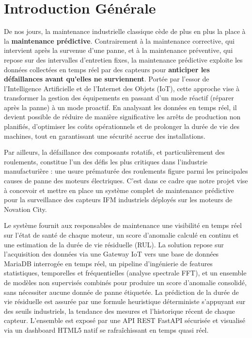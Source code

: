 \documentclass[12pt,a4paper]{report}
\begin{document}
\chapter*{Introduction Générale}

De nos jours, la maintenance industrielle classique cède de plus en plus la place à la
\textbf{maintenance prédictive}. Contrairement à la maintenance corrective, qui intervient
après la survenue d'une panne, et à la maintenance préventive, qui repose sur des
intervalles d'entretien fixes, la maintenance prédictive exploite les données collectées en
temps réel par des capteurs pour \textbf{anticiper les défaillances avant qu'elles ne
surviennent}. Portée par l'essor de l'Intelligence Artificielle et de l'Internet des Objets
(IoT), cette approche vise à transformer la gestion des équipements en passant d'un mode
réactif (réparer après la panne) à un mode proactif. En analysant les données en temps réel,
il devient possible de réduire de manière significative les arrêts de production non
planifiés, d'optimiser les coûts opérationnels et de prolonger la durée de vie des machines,
tout en garantissant une sécurité accrue des installations.

Par ailleurs, la défaillance des composants rotatifs, et particulièrement des roulements,
constitue l'un des défis les plus critiques dans l'industrie manufacturière : une usure
prématurée des roulements figure parmi les principales causes de panne des moteurs
électriques. C'est dans ce cadre que notre projet vise à concevoir et mettre en place un
système complet de maintenance prédictive pour la surveillance des capteurs IFM
industriels déployés sur les moteurs de Novation City.

Le système fournit aux responsables de maintenance une visibilité en temps réel sur l'état
de santé de chaque moteur, un score d'anomalie calculé en continu et une estimation de la
durée de vie résiduelle (RUL). La solution repose sur l'acquisition des données via une
Gateway IoT vers une base de données MariaDB interrogée en temps réel, un pipeline
d'ingénierie de features statistiques, temporelles et fréquentielles (analyse spectrale FFT),
et un ensemble de modèles non supervisés combinés pour produire un score d'anomalie
consolidé, sans nécessiter aucune donnée de panne étiquetée. La prédiction de la durée de
vie résiduelle est assurée par une formule heuristique déterministe s'appuyant sur des
seuils industriels, la tendance des mesures et l'historique récent de chaque capteur.
L'ensemble est exposé par une API REST FastAPI sécurisée et visualisé via un dashboard
HTML5 natif se rafraîchissant en temps quasi réel.
\end{document}
